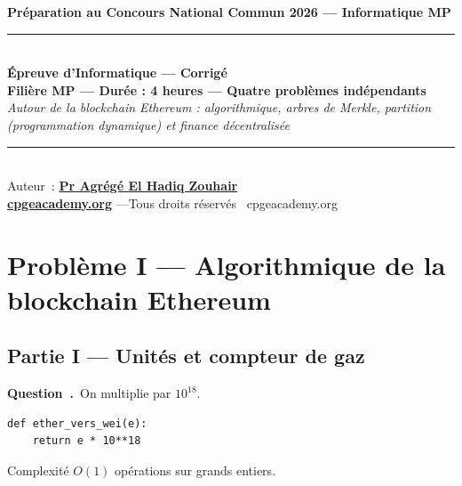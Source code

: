 \documentclass[11pt,a4paper]{article}
\newcounter{qcnt}
\newcommand{\Q}{\medskip\par\stepcounter{qcnt}\noindent\textbf{Question~\theqcnt.}~}
\begin{document}
\begin{center}
{\large\bfseries Préparation au Concours National Commun 2026 --- Informatique MP}\\[8pt]
\rule{0.9\linewidth}{0.5pt}\\[6pt]
{\Large\bfseries Épreuve d'Informatique --- Corrigé}\\[4pt]
{\bfseries Filière MP --- Durée : 4 heures --- Quatre problèmes indépendants}\\[6pt]
{\itshape Autour de la blockchain Ethereum : algorithmique, arbres de Merkle, partition (programmation dynamique) et finance décentralisée}\\[6pt]
\rule{0.9\linewidth}{0.5pt}\\[8pt]
{\small Auteur~: \href{https://orcid.org/0000-0002-6108-7176}{\textbf{Pr Agrégé El Hadiq Zouhair}}}\\[3pt]
{\small \href{https://cpgeacademy.org}{\textbf{cpgeacademy.org}} \quad---\quad Tous droits réservés \textcopyright\ cpgeacademy.org}
\end{center}
\medskip
\begin{center}
\end{center}
\bigskip

\setcounter{qcnt}{0}

\section*{Problème I --- Algorithmique de la blockchain Ethereum}
\subsection*{Partie I --- Unités et compteur de gaz}

\Q On multiplie par $10^{18}$.
\begin{lstlisting}
def ether_vers_wei(e):
    return e * 10**18
\end{lstlisting}
Complexité $O(1)$ opérations sur grands entiers.
\end{document}
